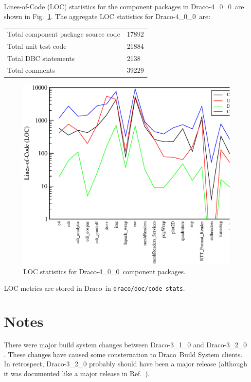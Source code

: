 \documentclass[11pt]{nmemo}
\newcommand{\draco}{Draco}
\newcommand{\dracor}{\draco-4\_0\_0}
\begin{document}
Lines-of-Code (LOC) statistics for the component packages in \dracor\ 
are shown in Fig.~\ref{fig:stats}.  The aggregate LOC statistics for
\dracor\ are:
\begin{center}
  \begin{tabular}{|l|l|} \hline
    Total component package source code & 17892 \\
    Total unit test code & 21884 \\
    Total DBC statements & 2138 \\
    Total comments & 39229 \\
    \hline
  \end{tabular}
\end{center}
\begin{figure}
  \label{fig:stats}
  \centerline{
    \includegraphics[width=6in]{loc-3_2_0.eps}}
  \caption{LOC statistics for \dracor\ component packages.}
\end{figure}

LOC metrics are stored in \draco\ in \texttt{draco/doc/code\_stats}.


\section{Notes}

There were major build system changes between \draco-3\_1\_0 and
\draco-3\_2\_0 \cite{draco-3_2_0}.  These changes have caused some
consternation to \draco\ Build System clients.  In retrospect,
\draco-3\_2\_0 probably should have been a major release (although it
was documented like a major release in Ref.~\citen{draco-3_2_0}).
\end{document}
